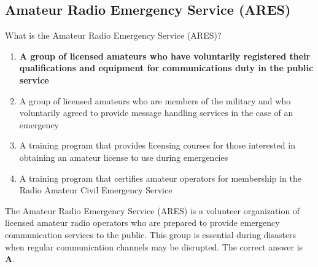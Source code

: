 \subsection{Amateur Radio Emergency Service (ARES)}
\label{T2C06}

\begin{tcolorbox}[colback=gray!10!white,colframe=black!75!black,title=T2C06]
What is the Amateur Radio Emergency Service (ARES)?
\begin{enumerate}[noitemsep]
    \item \textbf{A group of licensed amateurs who have voluntarily registered their qualifications and equipment for communications duty in the public service}
    \item A group of licensed amateurs who are members of the military and who voluntarily agreed to provide message handling services in the case of an emergency
    \item A training program that provides licensing courses for those interested in obtaining an amateur license to use during emergencies
    \item A training program that certifies amateur operators for membership in the Radio Amateur Civil Emergency Service
\end{enumerate}
\end{tcolorbox}

The Amateur Radio Emergency Service (ARES) is a volunteer organization of licensed amateur radio operators who are prepared to provide emergency communication services to the public. This group is essential during disasters when regular communication channels may be disrupted. The correct answer is \textbf{A}.